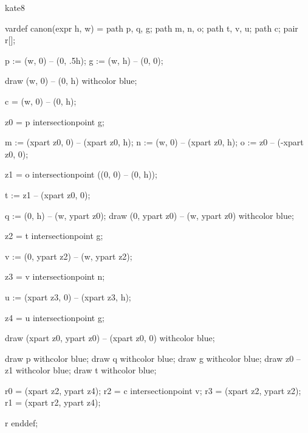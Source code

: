 

\startenvironment kate8

	\startMPdefinitions
		vardef canon(expr h, w) =
			path p, q, g;
			path m, n, o;
			path t, v, u;
			path c;
			pair r[];

			p := (w, 0) -- (0, .5h); %
			g := (w, h) -- (0, 0); %

			draw (w, 0) -- (0, h) withcolor blue;

			c = (w, 0) -- (0, h);

			z0 = p intersectionpoint g; %

			m := (xpart z0, 0) -- (xpart z0, h); %
			n := (w, 0) -- (xpart z0, h); %
			o := z0 -- (-xpart z0, 0); %

			z1 = o intersectionpoint ((0, 0) -- (0, h)); %

			t := z1 -- (xpart z0, 0); %

			q := (0, h) -- (w, ypart z0); %
			draw (0, ypart z0) -- (w, ypart z0) withcolor blue;

			z2 = t intersectionpoint g; %

			v := (0, ypart z2) -- (w, ypart z2); %

			z3 = v intersectionpoint n; %

			u := (xpart z3, 0) -- (xpart z3, h); %

			z4 = u intersectionpoint g; %

			draw (xpart z0, ypart z0) -- (xpart z0, 0) withcolor blue;

			draw p withcolor blue;
			draw q withcolor blue;
			draw g withcolor blue;
			draw z0 -- z1 withcolor blue;
			draw t withcolor blue;

			r0 = (xpart z2, ypart z4); %
			r2 = c intersectionpoint v; %
			r3 = (xpart z2, ypart z2); %
			r1 = (xpart r2, ypart z4); %

			r
		enddef;

	\stopMPdefinitions

\stopenvironment

